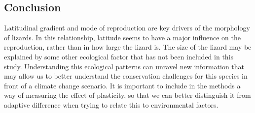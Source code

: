 \documentclass[
]{article}
\begin{document}
\subsection{Conclusion}\label{conclusion}

Latitudinal gradient and mode of reproduction are key drivers of the
morphology of lizards. In this relationship, latitude seems to have a
major influence on the reproduction, rather than in how large the lizard
is. The size of the lizard may be explained by some other ecological
factor that has not been included in this study. Understanding this
ecological patterns can unravel new information that may allow us to
better understand the conservation challenges for this species in front
of a climate change scenario. It is important to include in the methods
a way of measuring the effect of plasticity, so that we can better
distinguish it from adaptive difference when trying to relate this to
environmental factors.
\end{document}
